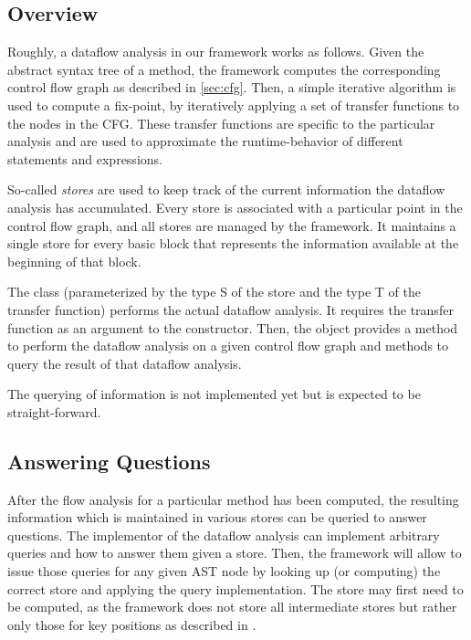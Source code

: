 \subsection{Overview}

Roughly, a dataflow analysis in our framework works as follows. Given the abstract syntax
tree of a method, the framework computes the corresponding control flow graph as
described in \autoref{sec:cfg}. Then, a simple iterative algorithm is used to compute
a fix-point, by iteratively applying a set of transfer functions to the nodes in the
CFG. These transfer functions are specific to the particular analysis and are used
to approximate the runtime-behavior of different statements and expressions.

So-called \emph{stores} are used to keep track of the current information the dataflow
analysis has accumulated. Every store is associated with a particular point in the
control flow graph, and all stores are managed by the framework. It maintains
a single store for every basic block that represents the information available at the
beginning of that block.

The class  (parameterized by the type \code S of the store and the type \code T of the
transfer function) performs the actual dataflow analysis. It requires the transfer function
as an argument to the constructor. Then, the object provides a method to perform the dataflow
analysis on a given control flow graph and methods to query the result of that dataflow analysis.

\begin{workinprogress}
    The querying of information is not implemented yet but is expected to be straight-forward.
\end{workinprogress}




\subsection{Answering Questions}

After the flow analysis for a particular method has been computed, the resulting information
which is maintained in various stores can be queried to answer questions. The implementor
of the dataflow analysis can implement arbitrary queries and how to answer them
given a store. Then, the framework will allow to issue those queries for
any given AST node by looking up (or computing) the correct store and applying the query
implementation.
The store may first need to be computed, as the framework does not store all intermediate
stores but rather only those for key positions as described in .

